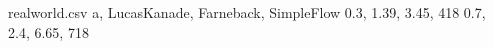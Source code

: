 \newcommand{\HRule}{\rule{\linewidth}{0.5mm}}

\usepackage{pgfplots}
\usepackage{pgfplotstable}
\usepackage{filecontents}
\begin{filecontents*}{realworld.csv}
  a, 	  LucasKanade,	Farneback,	SimpleFlow
  0.3,	1.39,	        3.45,	      418
  0.7,	2.4,	        6.65,	      718
\end{filecontents*}